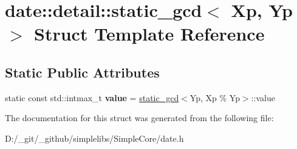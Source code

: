 \hypertarget{structdate_1_1detail_1_1static__gcd}{}\section{date\+::detail\+::static\+\_\+gcd$<$ Xp, Yp $>$ Struct Template Reference}
\label{structdate_1_1detail_1_1static__gcd}
\subsection*{Static Public Attributes}
\begin{DoxyCompactItemize}
\item 
\mbox{\label{structdate_1_1detail_1_1static__gcd_a546cd3f2a6d2e8ecd54d7319f6877299}} 
static const std\+::intmax\+\_\+t {\bfseries value} = \mbox{\hyperlink{structdate_1_1detail_1_1static__gcd}{static\+\_\+gcd}}$<$Yp, Xp \% Yp$>$\+::value
\end{DoxyCompactItemize}


The documentation for this struct was generated from the following file\+:\begin{DoxyCompactItemize}
\item 
D\+:/\+\_\+git/\+\_\+github/simplelibs/\+Simple\+Core/date.\+h\end{DoxyCompactItemize}
